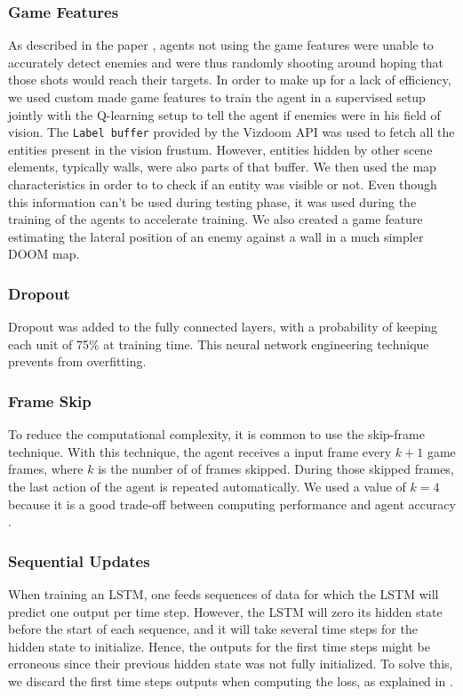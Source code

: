 \documentclass[letterpaper]{article}
\begin{document}
\subsubsection{Game Features} As described in the paper \citep{Lample2016},
agents not using the game features were unable to accurately detect enemies and
were thus randomly shooting around hoping that those shots would reach their
targets. In order to make up for a lack of efficiency, we used custom made game
features to train the agent in a supervised setup jointly with the Q-learning
setup to tell the agent if enemies were in his field of vision.  The
\texttt{Label buffer} provided by the Vizdoom API  was used to fetch all the
entities present in the vision frustum. However, entities hidden by other scene
elements, typically walls, were also parts of that buffer. We then used the map
characteristics in order to to check if an entity was visible or not. Even
though this information can't be used during testing phase, it was used during
the training of the agents to accelerate training. We also created a game
feature estimating the lateral position of an enemy against a wall in a much
simpler DOOM map.

\subsubsection{Dropout}
Dropout \citep{Srivastava2014} was added to the fully connected layers, with
a probability of keeping each unit of 75\% at training time. This neural network
engineering technique prevents from overfitting.

\subsubsection{Frame Skip}
To reduce the computational complexity, it is common to use the skip-frame
technique. With this technique, the agent receives a input frame every $k + 1$
game frames, where $k$ is the number of of frames skipped. During those
skipped frames, the last action of the agent is repeated automatically.
We used a value of $k=4$ because it is a good trade-off between
computing performance and agent accuracy \citep{Kempka2016}.


\subsubsection{Sequential Updates}
When training an LSTM, one feeds sequences of data for which the LSTM will
predict one output per time step. However, the LSTM will zero its hidden state
before the start of each sequence, and it will take several time steps for the
hidden state to initialize. Hence, the outputs for the first time steps might
be erroneous since their previous hidden state was not fully initialized.
To solve this, we discard the first time steps outputs when computing the loss,
as explained in \citep{Lample2016}.
\end{document}
